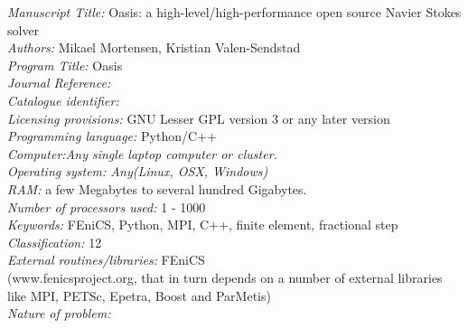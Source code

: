 \documentclass[final,3p,times,twocolumn]{elsarticle}
\newcounter{bla}
\begin{document}
\begin{small}
\noindent
{\em Manuscript Title:}  Oasis: a high-level/high-performance open source Navier Stokes solver                                       \\
{\em Authors: } Mikael Mortensen, Kristian Valen-Sendstad   \\
{\em Program Title:} Oasis                    \\
{\em Journal Reference:}                                      \\
{\em Catalogue identifier:}                                   \\
{\em Licensing provisions:} GNU Lesser GPL version 3 or any later version  \\
{\em Programming language:}  Python/C++                      \\
{\em Computer:Any single laptop computer or cluster.}    \\
{\em Operating system: Any(Linux, OSX, Windows)}                                       \\
{\em RAM:} a few Megabytes to several hundred Gigabytes.    \\
{\em Number of processors used:} 1 - 1000          \\
{\em Keywords:} FEniCS, Python, MPI, C++, finite element, fractional step  \\
{\em Classification:} 12                              \\
{\em External routines/libraries:} FEniCS \\
(www.fenicsproject.org, that in turn depends on a number of external libraries like MPI, PETSc, Epetra, Boost and ParMetis)  \\
{\em Nature of problem:}\\

\end{small}
\end{document}
